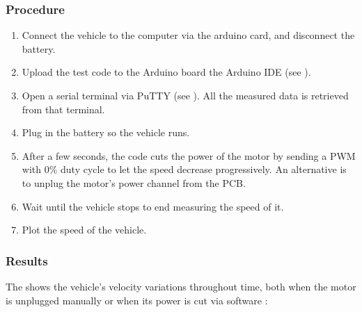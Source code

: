 \subsubsection{Procedure}

\begin{enumerate}
  \item Connect the vehicle to the computer via the arduino card, and disconnect the battery.
  \item Upload the test code to the Arduino board the Arduino IDE (see \cite{ArduinoIDE}).
  \item Open a serial terminal via PuTTY (see \cite{PuTTY}). All the measured data is retrieved from that terminal.
  \item Plug in the battery so the vehicle runs.
  \item After a few seconds, the code cuts the power of the motor by sending a PWM with 0\% duty cycle to let the speed decrease progressively. An alternative is to unplug the motor's power channel from the PCB.
  \item Wait until the vehicle stops to end measuring the speed of it.
  \item Plot the speed of the vehicle.
\end{enumerate}

\subsubsection{Results} \label{inertiaTestResults}

The  shows the vehicle's velocity variations throughout time, both when the motor is unplugged manually or when its power is cut via software :

